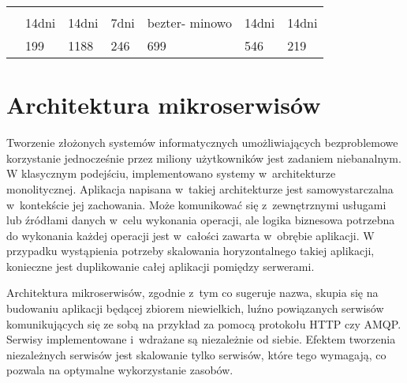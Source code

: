 \begin{minipage}{\textwidth}
\begin{table}[H]
\begin{tabular}{|P{.22\textwidth}|P{.09\textwidth}|P{.09\textwidth}|P{.09\textwidth}|P{.09\textwidth}|P{.09\textwidth}|P{.09\textwidth}|}
                  &        &            &           &             &        &      \\ \hline
                   &        &            &           &             &        &      \\ \hline
                           & 14dni     & 14dni         & 7dni         & bezter- minowo & 14dni     & 14dni   \\ \hline
                      & 199       & 1188          & 246          & 699            & 546       & 219     \\ \hline
        \end{tabular}
    \end{table}
\end{minipage}

\section{Architektura mikroserwisów}\label{sec:usefull-technologies}

Tworzenie złożonych systemów informatycznych umożliwiających bezproblemowe korzystanie jednocześnie przez miliony użytkowników jest zadaniem niebanalnym.
W klasycznym podejściu, implementowano systemy w~architekturze monolitycznej.
Aplikacja napisana w~takiej architekturze jest samowystarczalna w~kontekście jej zachowania.
Może komunikować się z~zewnętrznymi usługami lub źródłami danych w~celu wykonania operacji, ale logika biznesowa potrzebna do wykonania każdej operacji jest w~całości zawarta w~obrębie aplikacji.
W przypadku wystąpienia potrzeby skalowania horyzontalnego takiej aplikacji, konieczne jest duplikowanie całej aplikacji pomiędzy serwerami\cite{url:microsoft-web-architectures}.

\par
Architektura mikroserwisów, zgodnie z~tym co sugeruje nazwa, skupia się na budowaniu aplikacji będącej zbiorem niewielkich, luźno powiązanych serwisów komunikujących się ze sobą na przykład za pomocą protokołu HTTP czy AMQP.
Serwisy implementowane i~wdrażane są niezależnie od siebie\cite{book:dot-net-microservices}.
Efektem tworzenia niezależnych serwisów jest skalowanie tylko serwisów, które tego wymagają, co pozwala na optymalne wykorzystanie zasobów\cite{book:mastering-microservices-with-java9}.

